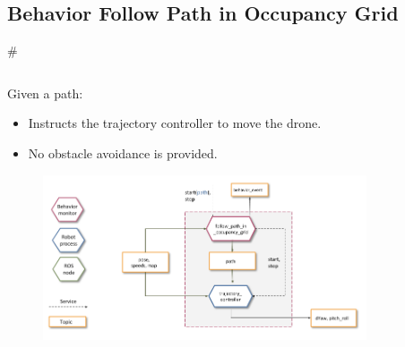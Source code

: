 \documentclass[]{beamer}
\def\mOrangeItem{\item[\textcolor{orange}{\textbullet}]}
\newcommand{\mSlideTitle}{{{\color{gray}\secname}} \# \subsecname}
\begin{document}
\subsection{Behavior Follow Path in Occupancy Grid}
\begin{frame}{\mSlideTitle}
  \begin{columns}
    \hspace{0.5cm}
    \begin{column}{0.55\textwidth}
      Given a path:
      \begin{itemize}
        \mOrangeItem Instructs the trajectory controller to move the drone.
        \mOrangeItem No obstacle avoidance is provided.
      \end{itemize}
      \begin{minipage}{0.65\textheight}
        \begin{figure}[!ht]
          \hspace{-2cm}
          \vspace{-2cm}
          \centering
          \includegraphics[width=1.5\textwidth,keepaspectratio]{BehaviorFPArquitecture.png}
        \end{figure}
      \end{minipage}
    \end{column}
    \hspace{1.5cm}
    \begin{column}{0.45\textwidth}
      \begin{figure}
        \centering

\end{figure}
\end{column}
\end{columns}
\end{frame}
\end{document}
